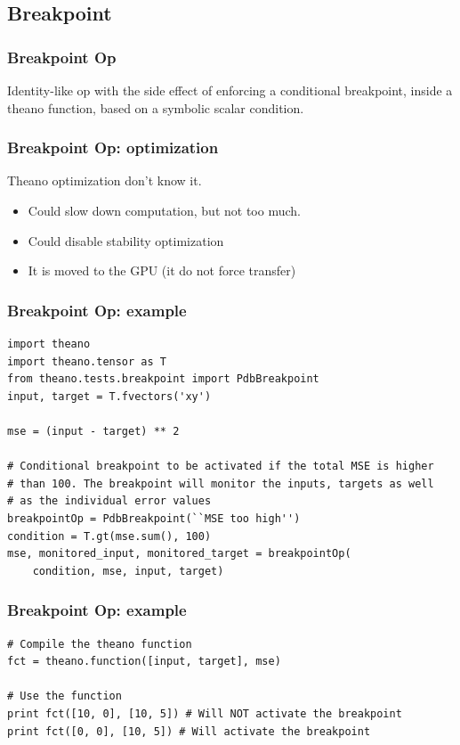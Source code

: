 \documentclass[utf8x,xcolor=pdftex,dvipsnames,table]{beamer}
\begin{document}
\subsection{Breakpoint}
\begin{frame}[fragile]
  \frametitle{Breakpoint Op} Identity-like op with the side effect of
  enforcing a conditional breakpoint, inside a theano function, based
  on a symbolic scalar condition.
\end{frame}

\begin{frame}[fragile]
  \frametitle{Breakpoint Op: optimization}
  Theano optimization don't know it.
\begin{itemize}
  \item Could slow down computation, but not too much.
  \item Could disable stability optimization
  \item It is moved to the GPU (it do not force transfer)
\end{itemize}
\end{frame}

\begin{frame}[fragile]
  \frametitle{Breakpoint Op: example}
\begin{lstlisting}
import theano
import theano.tensor as T
from theano.tests.breakpoint import PdbBreakpoint
input, target = T.fvectors('xy')

mse = (input - target) ** 2

# Conditional breakpoint to be activated if the total MSE is higher
# than 100. The breakpoint will monitor the inputs, targets as well
# as the individual error values
breakpointOp = PdbBreakpoint(``MSE too high'')
condition = T.gt(mse.sum(), 100)
mse, monitored_input, monitored_target = breakpointOp(
    condition, mse, input, target)
\end{lstlisting}
\end{frame}

\begin{frame}[fragile]
  \frametitle{Breakpoint Op: example}
\begin{lstlisting}
# Compile the theano function
fct = theano.function([input, target], mse)

# Use the function
print fct([10, 0], [10, 5]) # Will NOT activate the breakpoint
print fct([0, 0], [10, 5]) # Will activate the breakpoint
\end{lstlisting}

\end{frame}
\end{document}
